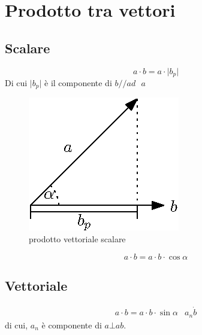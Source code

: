 \documentclass{book}
\newcommand{\abs}[1]{\lvert#1\rvert}
\begin{document}
\section{Prodotto tra vettori}
\label{sec:prodottotravect}

\subsection{Scalare}
\label{sec:scalare}

\begin{equation}
  \label{eq:scalare}
  a\cdot b=a\cdot\abs{b_p}
\end{equation}
Di cui $\abs{b_p}$ è il componente di $b//ad\text{ }a$
\begin{figure}[ht!]
  \centering
  \includegraphics{img/scalare.eps}
  \caption{prodotto vettoriale scalare}
  \label{fig:prodvectscal}
\end{figure}
\begin{equation}
  \label{eq:scalare2}
  a\cdot b= a\cdot b\cdot \cos \alpha
\end{equation}

\subsection{Vettoriale}
\label{sec:vectprod}
\begin{equation}
  \label{eq:prodvec}
  \begin{matrix}
    a\cdot b=a\cdot b\cdot \sin \alpha & a_n \dot b
  \end{matrix}
\end{equation}
di cui, $a_n$ è componente di $a \bot a b$.
\end{document}
